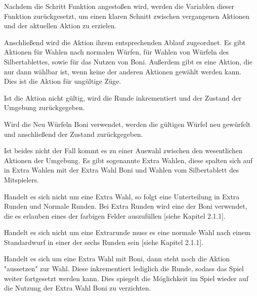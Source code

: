 Nachdem die Schritt Funktion angestoßen wird, werden die Variablen dieser Funktion zurückgesetzt, um einen klaren Schnitt zwischen vergangenen Aktionen und der aktuellen Aktion zu erzielen.

Anschließend wird die Aktion ihrem entsprechenden Ablauf zugeordnet. Es gibt Aktionen für Wahlen nach normalen Würfen, für Wahlen von Würfeln des Silbertablettes, sowie für das Nutzen von Boni. Außerdem gibt es eine Aktion, die nur dann wählbar ist, wenn keine der anderen Aktionen gewählt werden kann. Dies ist die Aktion für ungültige Züge.

Ist die Aktion nicht gültig, wird die Runde inkrementiert und der Zustand der Umgebung zurückgegeben.

Wird die Neu Würfeln Boni verwendet, werden die gültigen Würfel neu gewürfelt und anschließend der Zustand zurückgegeben.

Ist beides nicht der Fall kommt es zu einer Auswahl zwischen den wesentlichen Aktionen der Umgebung. Es gibt sogenannte Extra Wahlen, diese spalten sich auf in Extra Wahlen mit der Extra Wahl Boni und Wahlen vom Silbertablett des Mitspielers.

Handelt es sich nicht um eine Extra Wahl, so folgt eine Unterteilung in Extra Runden und Normale Runden. Bei Extra Runden wird eine der Boni verwendet, die es erlauben eines der farbigen Felder auszufüllen [siehe Kapitel 2.1.1].

Handelt es sich nicht um eine Extrarunde muss es eine normale Wahl nach einem Standardwurf in einer der sechs Runden sein [siehe Kapitel 2.1.1].

Handelt es sich um eine Extra Wahl mit Boni, dann steht noch die Aktion "aussetzen" zur Wahl. Diese inkrementiert lediglich die Runde, sodass das Spiel weiter fortgesetzt werden kann. Dies spiegelt die Möglichkeit im Spiel wieder auf die Nutzung der Extra Wahl Boni zu verzichten.\\

